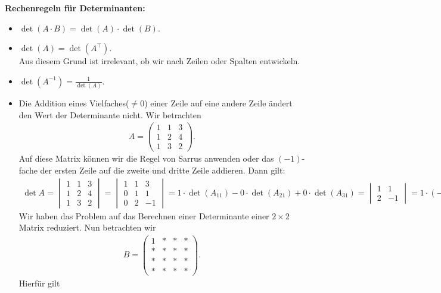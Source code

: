 \textbf{Rechenregeln für Determinanten:}
\begin{itemize}
\item $\det(A \cdot B) = \det(A) \cdot \det(B)$.
\item $\det(A) = \det(A^\top)$.\\
Aus diesem Grund ist irrelevant, ob wir nach Zeilen oder Spalten entwickeln.
\item $\det(A^{-1}) = \frac{1}{\det(A)}$.
\item Die Addition eines Vielfaches($\neq 0$) einer Zeile auf eine andere Zeile ändert den Wert der Determinante nicht.
Wir betrachten
\begin{align*}
A =
\begin{pmatrix}
1 & 1 & 3\\
1 & 2 & 4\\
1 & 3 & 2
\end{pmatrix}.
\end{align*}
Auf diese Matrix können wir die Regel von Sarrus anwenden 
oder das $(-1)$-fache der ersten Zeile auf die zweite und dritte Zeile addieren.
Dann gilt:
\begin{align*}
\det A
=
\begin{vmatrix}
1 & 1 & 3 \\
1 & 2 & 4\\
1 & 3 & 2
\end{vmatrix}
=
\begin{vmatrix}
1 & 1 & 3 \\
0 & 1 & 1\\
0 & 2 & -1
\end{vmatrix}
=
1 \cdot \det(A_{11}) - 0 \cdot \det(A_{21}) + 0 \cdot \det(A_{31})
=
\begin{vmatrix}
1 & 1 \\
2 & -1
\end{vmatrix}
= 1 \cdot (-1) - 2 = 3
\end{align*}
Wir haben das Problem auf das Berechnen einer Determinante einer $2 \times 2$ Matrix reduziert.
Nun betrachten wir
\begin{align*}
B =
\begin{pmatrix}
1 & \ast  & \ast & \ast\\
\ast &\ast &  \ast  & \ast\\
\ast &\ast &  \ast  & \ast\\
\ast &\ast &  \ast  & \ast
\end{pmatrix}.
\end{align*} 
Hierfür gilt
\begin{align*}

\end{align*}
\end{itemize}
